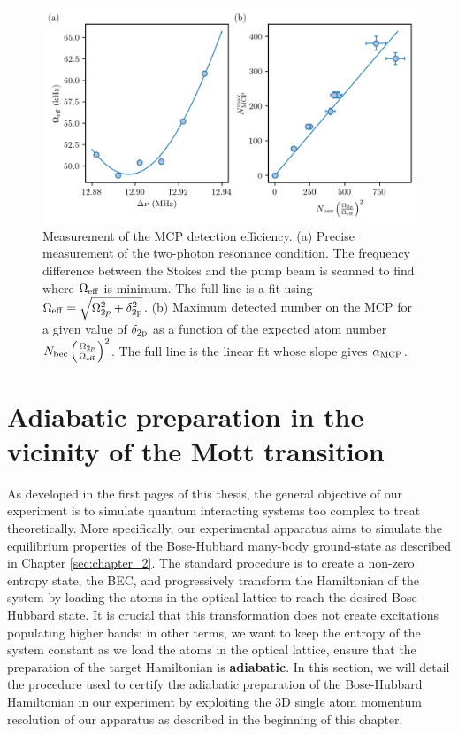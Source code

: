 \begin{figure}
    \centering
    \includegraphics[width=\textwidth]{Fig/Chapter3/eff_MCP.png}
    \caption[Measurement of the MCP detection efficiency]{Measurement of the MCP detection efficiency. (a) Precise measurement of the two-photon resonance condition. The frequency difference between the Stokes and the pump beam is scanned to find where $\Omega_{\rm{eff}}$ is minimum. The full line is a fit using $\Omega_{\rm{eff}}= \sqrt{\Omega_{2p}^2 + \delta_{\rm{2p}}^2}$. (b) Maximum detected number on the MCP for a given value of $\delta_{\rm{2p}}$ as a function of the expected atom number $N_{\rm{bec}} \left(\frac{\Omega_{2 p}}{\Omega_{\rm{eff}}}\right)^{2}$. The full line is the linear fit whose slope gives $\alpha_{\rm{MCP}}$.}
    \label{fig:eff_MCP}
\end{figure}

\section{Adiabatic preparation in the vicinity of the Mott transition}

\label{sec:adiabatic_prep}

As developed in the first pages of this thesis, the general objective of our experiment is to simulate quantum interacting systems too complex to treat theoretically. More specifically, our experimental apparatus aims to simulate the equilibrium properties of the Bose-Hubbard many-body ground-state as described in Chapter \ref{sec:chapter_2}. The standard procedure is to create a non-zero entropy state, the BEC, and progressively transform the Hamiltonian of the system by loading the atoms in the optical lattice to reach the desired Bose-Hubbard state. It is crucial that this transformation does not create excitations populating higher bands: in other terms, we want to keep the entropy of the system constant as we load the atoms in the optical lattice, \ie ensure that the preparation of the target Hamiltonian is \textbf{adiabatic}. In this section, we will detail the procedure used to certify the adiabatic preparation of the Bose-Hubbard Hamiltonian in our experiment by exploiting the 3D single atom momentum resolution of our apparatus as described in the beginning of this chapter. 


